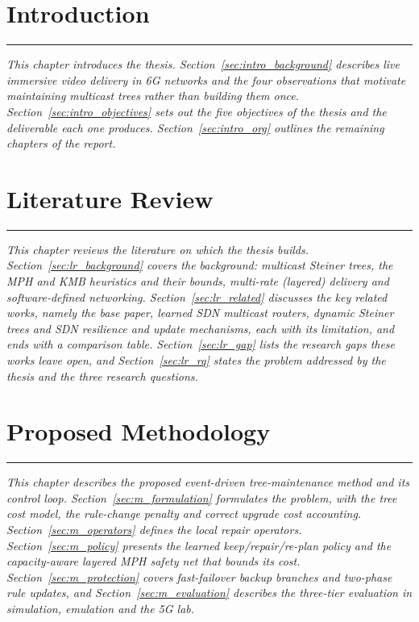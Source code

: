 \documentclass[12pt,phd,times]{pkmthesis}
\begin{document}
{%
\chapter{Introduction}\label{chap:intro}
\vspace{-1cm}

\noindent \rule{6.6in}{0.01in}
\emph{This chapter introduces the thesis. Section~\ref{sec:intro_background} describes live immersive video delivery in 6G networks and the four observations that motivate maintaining multicast trees rather than building them once. Section~\ref{sec:intro_objectives} sets out the five objectives of the thesis and the deliverable each one produces. Section~\ref{sec:intro_org} outlines the remaining chapters of the report.}


\chapter{Literature Review}\label{chap:L_survey}
\vspace{-1cm}
\noindent \rule{6.6in}{0.01in}
\emph{This chapter reviews the literature on which the thesis builds. Section~\ref{sec:lr_background} covers the background: multicast Steiner trees, the MPH and KMB heuristics and their bounds, multi-rate (layered) delivery and software-defined networking. Section~\ref{sec:lr_related} discusses the key related works, namely the base paper, learned SDN multicast routers, dynamic Steiner trees and SDN resilience and update mechanisms, each with its limitation, and ends with a comparison table. Section~\ref{sec:lr_gap} lists the research gaps these works leave open, and Section~\ref{sec:lr_rq} states the problem addressed by the thesis and the three research questions.}


\chapter{Proposed Methodology}\label{chap:methodology}
\vspace{-1cm}
\noindent \rule{6.6in}{0.01in}
\emph{This chapter describes the proposed event-driven tree-maintenance method and its control loop. Section~\ref{sec:m_formulation} formulates the problem, with the tree cost model, the rule-change penalty and correct upgrade cost accounting. Section~\ref{sec:m_operators} defines the local repair operators. Section~\ref{sec:m_policy} presents the learned keep/repair/re-plan policy and the capacity-aware layered MPH safety net that bounds its cost. Section~\ref{sec:m_protection} covers fast-failover backup branches and two-phase rule updates, and Section~\ref{sec:m_evaluation} describes the three-tier evaluation in simulation, emulation and the 5G lab.}


}
\end{document}
